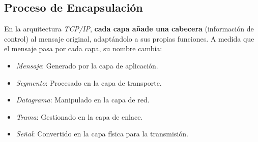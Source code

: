 \documentclass{article}
\begin{document}
\subsection{Proceso de Encapsulación}
En la arquitectura \textit{TCP/IP}, \textbf{cada capa añade una cabecera} (información de control) al mensaje original, adaptándolo a sus propias funciones. A medida que el mensaje pasa por cada capa, su nombre cambia:
\begin{itemize}
    \item \textit{Mensaje}: Generado por la capa de aplicación.
    \item \textit{Segmento}: Procesado en la capa de transporte.
    \item \textit{Datagrama}: Manipulado en la capa de red.
    \item \textit{Trama}: Gestionado en la capa de enlace.
    \item \textit{Señal}: Convertido en la capa física para la transmisión.
\end{itemize}
\end{document}
